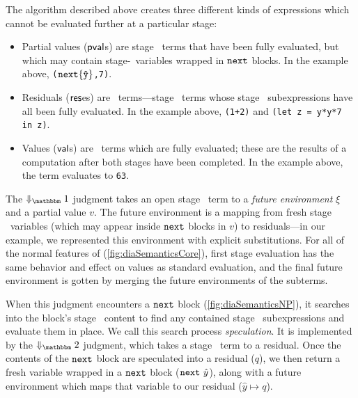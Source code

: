 
The algorithm described above creates three different kinds of expressions which
cannot be evaluated further at a particular stage:
\begin{itemize}
\item 
Partial values ($\mathsf{pval}$s) are stage \bbone\ terms that have been fully evaluated, 
but which may contain stage-\bbtwo\ variables wrapped in ${\tt next}$ blocks. 
In the example above, 
\verb|(|${\tt next} \{\mathtt{\hat y}\}$\verb|,7)|.
\item Residuals ($\mathsf{res}$es) are \langTwo\ terms---stage \bbtwo\ terms whose
stage \bbone\ subexpressions have all been fully evaluated. In the example
above,
\verb|(1+2)| and \verb|(let z = y*y*7 in z)|.
\item Values ($\mathsf{val}$s) are \langTwo\ terms which are fully evaluated; these
are the results of a computation after both stages have been completed. In the
example above, the term evaluates to \verb|63|.
\end{itemize}
The $\redonesym$ judgment takes an open stage \bbone\ term to a {\em future
environment} $\xi$ and a partial value $v$.  The future environment is a mapping
from fresh stage \bbtwo\ variables (which may appear inside ${\tt next}$ blocks in
$v$) to residuals---in our example, we represented this environment with
explicit substitutions. For all of the normal features of \lang
(\ref{fig:diaSemanticsCore}), first stage evaluation has the same behavior and
effect on values as standard evaluation, and the final future environment is
gotten by merging the future environments of the subterms.

When this judgment encounters a ${\tt next}$ block (\ref{fig:diaSemanticsNP}), it
searches into the block's stage \bbtwo\ content to find any contained stage
\bbone\ subexpressions and evaluate them in place.  We call this search process
\emph{speculation}. It is implemented by the $\redtwosym$ judgment, which takes
a stage \bbtwo\ term to a residual.  Once the contents of the ${\tt next}$ block are
speculated into a residual ($q$), we then return a fresh variable wrapped in a
${\tt next}$ block (${\tt next}~\hat y$), along with a future environment which maps that
variable to our residual ($\hat y \mapsto q$).

